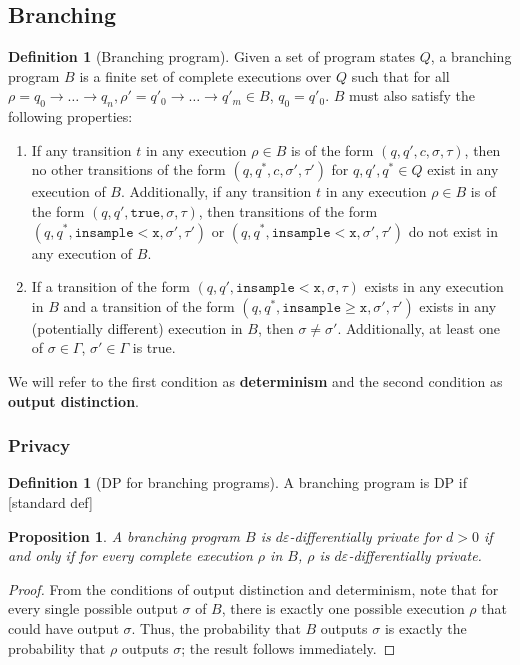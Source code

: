 \documentclass[12pt]{article}
\newcommand{\gguard}[1][x]{\texttt{insample}\geq #1}
\newcommand{\lguard}[1][x]{\texttt{insample} < #1}
\newtheorem{prop}[thm]{Proposition}
\theoremstyle{definition}
\newtheorem{defn}[thm]{Definition}
\begin{document}
\subsection{Branching}


\begin{defn}[Branching program]
    Given a set of program states $Q$, a branching program $B$ is a finite set of complete executions over $Q$ such that for all $\rho=q_0\to\ldots\to q_n, \rho'=q'_0\to\ldots\to q'_m\in B$, $q_0=q'_0$. $B$ must also satisfy the following properties: \begin{enumerate}
        \item If any transition $t$ in any execution $\rho\in B$ is of the form $(q, q', c, \sigma, \tau)$, then no other transitions of the form $(q, q^*, c, \sigma', \tau')$ for $q, q', q^*\in Q$ exist in any execution of $B$. 
        Additionally, if any transition $t$ in any execution $\rho\in B$ is of the form $(q, q', \texttt{true}, \sigma, \tau)$, then transitions of the form $(q, q^*, \lguard[\texttt{x}], \sigma', \tau')$ or $(q, q^*, \lguard[\texttt{x}], \sigma', \tau')$ do not exist in any execution of $B$.
        \item If a transition of the form $(q, q', \lguard[\texttt{x}], \sigma, \tau)$ exists in any execution in $B$ and a transition of the form $(q, q^*, \gguard[\texttt{x}], \sigma', \tau')$ exists in any (potentially different) execution in $B$, then $\sigma \neq \sigma'$. Additionally, at least one of $\sigma\in \Gamma$, $\sigma'\in \Gamma$ is true.
    \end{enumerate} 
    We will refer to the first condition as \textbf{determinism} and the second condition as \textbf{output distinction}.
\end{defn}

\subsubsection{Privacy}

\begin{defn}[DP for branching programs]
    A branching program is DP if [standard def]
\end{defn}

\begin{prop}
    A branching program $B$ is $d\varepsilon$-differentially private for $d>0$ if and only if for every complete execution $\rho$ in $B$, $\rho$ is $d\varepsilon$-differentially private.
\end{prop}
\begin{proof}
    From the conditions of output distinction and determinism, note that for every single possible output $\sigma$ of $B$, there is exactly one possible execution $\rho$ that could have output $\sigma$. Thus, the probability that $B$ outputs $\sigma$ is exactly the probability that $\rho$ outputs $\sigma$; the result follows immediately.
\end{proof}
\end{document}
